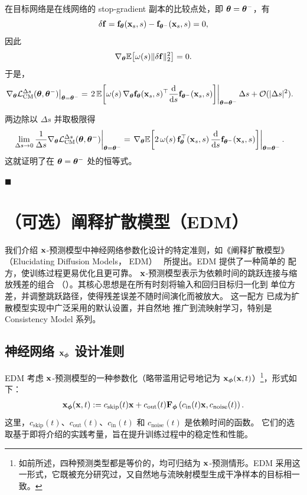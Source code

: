 在目标网络是在线网络的 stop-gradient 副本的比较点处，即 ${\bm{\theta}}={\bm{\theta}}^-$，有
\[
\delta {\mathbf{f}}
=
{\mathbf{f}}_{{\bm{\theta}}}({\mathbf{x}}_s,s)-{\mathbf{f}}_{{\bm{\theta}}^-}({\mathbf{x}}_s,s)
=
0,
\]
因此
\[
\nabla_{{\bm{\theta}}}\mathbb{E}\!\left[\omega(s)\|\delta {\mathbf{f}}\|_2^2\right]=0.
\]
于是，
\begin{align*}
\left.
\nabla_{{\bm{\theta}}}\mathcal{L}_{\mathrm{CM}}^{\Delta s}({\bm{\theta}},{\bm{\theta}}^-)
\right|_{{\bm{\theta}}={\bm{\theta}}^-}
&=
\left.
2\,\mathbb{E}\!\left[
\omega(s)\,
\nabla_{{\bm{\theta}}}{\mathbf{f}}_{{\bm{\theta}}}({\mathbf{x}}_s,s)^\top
\frac{\mathop{}\!\mathrm{d}}{\mathop{}\!\mathrm{d} s}{\mathbf{f}}_{{\bm{\theta}}^-}({\mathbf{x}}_s,s)
\right]
\right|_{{\bm{\theta}}={\bm{\theta}}^-}\Delta s
+
\mathcal{O}(|\Delta s|^2).
\end{align*}

两边除以 $\Delta s$ 并取极限得
\begin{align*}
\left.
\lim_{\Delta s\to 0}\frac{1}{\Delta s}\nabla_{{\bm{\theta}}}\mathcal{L}_{\mathrm{CM}}^{\Delta s}({\bm{\theta}},{\bm{\theta}}^-)
\right|_{{\bm{\theta}}={\bm{\theta}}^-}
&=
\left.
\nabla_{{\bm{\theta}}}\mathbb{E}\!\left[
2\,\omega(s)\,
{\mathbf{f}}_{{\bm{\theta}}}^\top({\mathbf{x}}_s,s)\,
\frac{\mathop{}\!\mathrm{d}}{\mathop{}\!\mathrm{d} s}{\mathbf{f}}_{{\bm{\theta}}^-}({\mathbf{x}}_s,s)
\right]
\right|_{{\bm{\theta}}={\bm{\theta}}^-}.
\end{align*}
这就证明了在 ${\bm{\theta}}={\bm{\theta}}^-$ 处的恒等式。

\hfill$\blacksquare$


\newpage
\section{（可选）阐释扩散模型（EDM）}\label{sec:edm}

我们介绍
${\mathbf{x}}$-预测模型中神经网络参数化设计的特定准则，如《阐释扩散模型》
（Elucidating Diffusion Models，
EDM）~\citep{karras2022elucidating} 所提出。EDM 提供了一种简单的
配方，使训练过程更易优化且更可靠。
${\mathbf{x}}$-预测模型表示为依赖时间的跳跃连接与缩放残差的组合
（）。其核心思想是在所有时刻将输入和回归目标归一化到
单位方差，并调整跳跃路径，使得残差误差不随时间演化而被放大。
这一配方
已成为扩散模型实现中广泛采用的默认设置，并自然地
推广到流映射学习，特别是 Consistency Model 系列。




\subsection{神经网络 ${\mathbf{x}}_{\bm{\phi}}$ 设计准则}\label{subsec:D-design-edm}

EDM 考虑 ${\mathbf{x}}$-预测模型的一种参数化（略带滥用记号地记为 ${\mathbf{x}}_{\bm{\phi}}({\mathbf{x}}, t)$）\footnote{如前所述，四种预测类型都是等价的，均可归结为 ${\mathbf{x}}$-预测情形。EDM 采用这一形式，它既被充分研究过，又自然地与流映射模型生成干净样本的目标相一致。}，形式如下：
\begin{align}\label{eq:D-parametrization}
    {\mathbf{x}}_{\bm{\phi}}({\mathbf{x}}, t) := c_{\mathrm{skip}}(t) {\mathbf{x}} + c_{\mathrm{out}}(t) {\mathbf{F}}_{\bm{\phi}}\left(c_{\mathrm{in}}(t) {\mathbf{x}}, c_{\mathrm{noise}}(t)\right).
\end{align}
这里，$c_{\mathrm{skip}}(t)$、$c_{\mathrm{out}}(t)$、$c_{\mathrm{in}}(t)$ 和 $c_{\mathrm{noise}}(t)$ 是依赖时间的函数。
它们的选取基于即将介绍的实践考量，旨在提升训练过程中的稳定性和性能。



